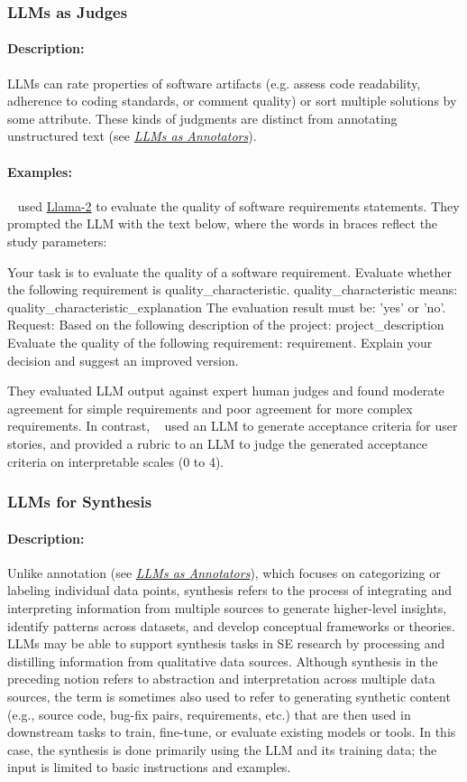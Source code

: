 \documentclass[smallextended]{svjour3}
\newcommand{\annotators}{\hyperref[sec:llms-as-annotators]{\emph{LLMs as Annotators}}\xspace}
\newcommand{\annotators}{\href{/study-types\#llms-as-annotators}{\emph{LLMs as Annotators}}\xspace}
\newcommand{\studytypesubsection}[1]{\subsubsection{#1}}
\newcommand{\studytypeparagraph}[1]{\paragraph{\bfseries #1:}}
\newcommand{\studytypesubsection}[1]{\subsection{#1}}
\newcommand{\studytypeparagraph}[1]{\subsubsection{#1}}
\begin{document}
\studytypesubsection{LLMs as Judges}
\label{sec:llms-as-judges}

\studytypeparagraph{Description}

LLMs can rate properties of software artifacts (e.g. assess code readability, adherence to coding standards, or comment quality) or sort multiple solutions by some attribute. These kinds of judgments are distinct from annotating unstructured text (see \annotators).

\studytypeparagraph{Examples}

\citeauthor{DBLP:conf/re/LubosFTGMEL24}~\cite{DBLP:conf/re/LubosFTGMEL24} used \href{https://www.llama.com/llama2/}{Llama-2} to evaluate the quality of software requirements statements. 
They prompted the LLM with the text below, where the words in braces reflect the study parameters:

\begin{plain}
Your task is to evaluate the quality of a software requirement.
Evaluate whether the following requirement is {quality_characteristic}.
{quality_characteristic} means: {quality_characteristic_explanation}
The evaluation result must be: 'yes' or 'no'.
Request: Based on the following description of the project: {project_description}
Evaluate the quality of the following requirement: {requirement}.
Explain your decision and suggest an improved version.
\end{plain}

They evaluated LLM output against expert human judges and found moderate agreement for simple requirements and poor agreement for more complex requirements. In contrast, \citeauthor{DBLP:conf/kbse/WangALHTASL25}~\cite{DBLP:conf/kbse/WangALHTASL25} used an LLM to generate acceptance criteria for user stories, and provided a rubric to an LLM to judge the generated acceptance criteria on interpretable scales (0 to 4). 
 
\studytypesubsection{LLMs for Synthesis}
\label{sec:llms-for-synthesis}

\studytypeparagraph{Description}

Unlike annotation (see \annotators), which focuses on categorizing or labeling individual data points, synthesis refers to the process of integrating and interpreting information from multiple sources to generate higher-level insights, identify patterns across datasets, and develop conceptual frameworks or theories. LLMs may be able to support synthesis tasks in SE research by processing and distilling information from qualitative data sources. 
Although synthesis in the preceding notion refers to abstraction and interpretation across multiple data sources, the term is sometimes also used to refer to generating synthetic content (e.g., source code, bug-fix pairs, requirements, etc.) that are then used in downstream tasks to train, fine-tune, or evaluate existing models or tools.
In this case, the synthesis is done primarily using the LLM and its training data; the input is limited to basic instructions and examples.
\end{document}

